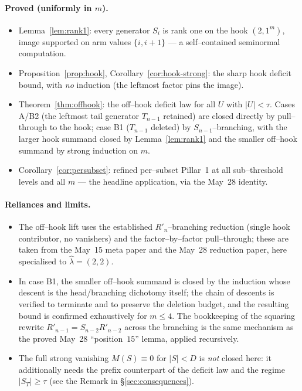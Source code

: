 \documentclass[11pt]{article}
\theoremstyle{definition}
\newcommand{\Rp}{{R'}}
\newcommand{\hatl}{\widehat\lambda}
\begin{document}
\paragraph{Proved (uniformly in $m$).}
\begin{itemize}[topsep=0.2em,itemsep=0.1em]
\item Lemma~\ref{lem:rank1}: every generator $S_i$ is rank one on the hook $(2,1^m)$, image
   supported on arm values $\{i,i+1\}$ --- a self--contained seminormal computation.
\item Proposition~\ref{prop:hook}, Corollary~\ref{cor:hook-strong}: the sharp hook deficit
   bound, with \emph{no} induction (the leftmost factor pins the image).
\item Theorem~\ref{thm:offhook}: the off--hook deficit law for all $U$ with $|U|<\tau$.
   Cases A/B2 (the leftmost tail generator $T_{n-1}$ retained) are closed directly by
   pull--through to the hook; case B1 ($T_{n-1}$ deleted) by $S_{n-1}$--branching, with the
   larger hook summand closed by Lemma~\ref{lem:rank1} and the smaller off--hook summand by
   strong induction on $m$.
\item Corollary~\ref{cor:persubset}: refined per--subset Pillar~1 at all sub--threshold
   levels and all $m$ --- the headline application, via the May~28 identity.
\end{itemize}

\paragraph{Reliances and limits.}
\begin{itemize}[topsep=0.2em,itemsep=0.1em]
\item The off--hook lift uses the established $\Rp_n$--branching reduction (single hook
   contributor, no vanishers) and the factor--by--factor pull--through; these are taken from
   the May~15 meta paper and the May~28 reduction paper, here specialised to $\hatl=(2,2)$.
\item In case B1, the smaller off--hook summand is closed by the induction whose descent is
   the head/branching dichotomy itself; the chain of descents is verified to terminate and to
   preserve the deletion budget, and the resulting bound is confirmed exhaustively for
   $m\le4$. The bookkeeping of the squaring rewrite $\Rp_{n-1}=S_{n-2}\Rp_{n-2}$ across the
   branching is the same mechanism as the proved May~28 ``position~$15$'' lemma, applied
   recursively.
\item The full strong vanishing $M(S)\equiv0$ for $|S|<D$ is \emph{not} closed here: it
   additionally needs the prefix counterpart of the deficit law and the regime
   $|S_T|\ge\tau$ (see the Remark in \S\ref{sec:consequences}).
\end{itemize}
\end{document}
